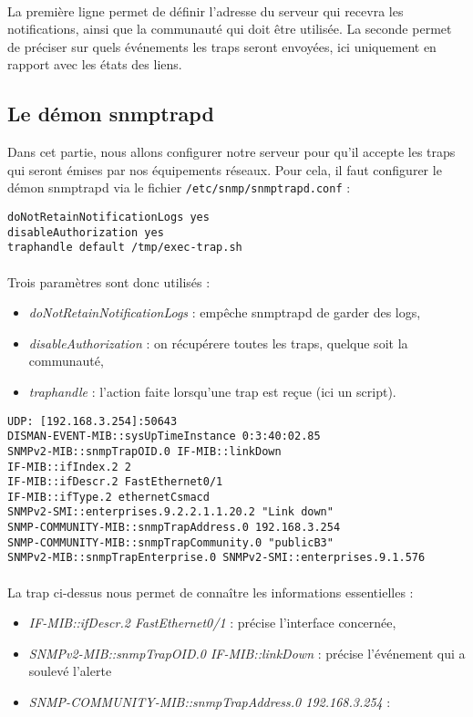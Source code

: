 \documentclass[12pt,a4paper,notitlepage]{article}
\begin{document}
\paragraph{} La première ligne permet de définir l'adresse du serveur qui recevra les notifications, ainsi que la communauté qui doit être utilisée. La seconde permet de préciser sur quels événements les traps seront envoyées, ici uniquement en rapport avec les états des liens.

\subsection{Le démon snmptrapd}
Dans cet partie, nous allons configurer notre serveur pour qu'il accepte les traps qui seront émises par nos équipements réseaux. Pour cela, il faut configurer le démon snmptrapd via le fichier \texttt{/etc/snmp/snmptrapd.conf} :

\begin{lstlisting}[title=Configuration de snmptrapd]
doNotRetainNotificationLogs yes
disableAuthorization yes
traphandle default /tmp/exec-trap.sh
\end{lstlisting}

\paragraph{} Trois paramètres sont donc utilisés : 
\begin{itemize}
\item \textit{doNotRetainNotificationLogs} : empêche snmptrapd de garder des logs,
\item \textit{disableAuthorization} : on récupérere toutes les traps, quelque soit la communauté,
\item \textit{traphandle} : l'action faite lorsqu'une trap est reçue (ici un script).
\end{itemize}\bigskip

\begin{lstlisting}[title=Exemple de trap reçue]
UDP: [192.168.3.254]:50643
DISMAN-EVENT-MIB::sysUpTimeInstance 0:3:40:02.85
SNMPv2-MIB::snmpTrapOID.0 IF-MIB::linkDown
IF-MIB::ifIndex.2 2
IF-MIB::ifDescr.2 FastEthernet0/1
IF-MIB::ifType.2 ethernetCsmacd
SNMPv2-SMI::enterprises.9.2.2.1.1.20.2 "Link down"
SNMP-COMMUNITY-MIB::snmpTrapAddress.0 192.168.3.254
SNMP-COMMUNITY-MIB::snmpTrapCommunity.0 "publicB3"
SNMPv2-MIB::snmpTrapEnterprise.0 SNMPv2-SMI::enterprises.9.1.576
\end{lstlisting}

\paragraph{} La trap ci-dessus nous permet de connaître les informations essentielles :
\begin{itemize}
\item \textit{IF-MIB::ifDescr.2 FastEthernet0/1} : précise l'interface concernée,
\item \textit{SNMPv2-MIB::snmpTrapOID.0 IF-MIB::linkDown} : précise l'événement qui a soulevé l'alerte
\item \textit{SNMP-COMMUNITY-MIB::snmpTrapAddress.0 192.168.3.254} :
\end{itemize}
\end{document}
